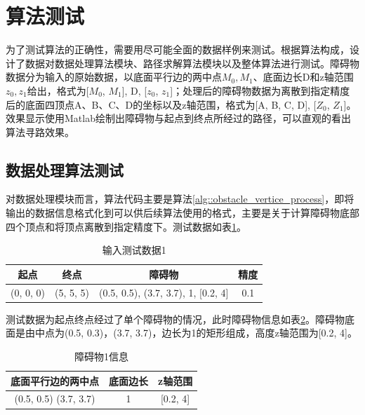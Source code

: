 \setcounter{table}{0}
\setcounter{figure}{0}
\section{算法测试}
\par 为了测试算法的正确性，需要用尽可能全面的数据样例来测试。根据算法构成，设计了数据对数据处理算法模块、路径求解算法模块以及整体算法进行测试。障碍物数据分为输入的原始数据，以底面平行边的两中点$M_0,M_1$、底面边长D和z轴范围$z_0,z_1$给出，格式为[$M_0$, $M_1$], D, [$z_0$, $z_1$]；处理后的障碍物数据为离散到指定精度后的底面四顶点A、B、C、D的坐标以及z轴范围，格式为[A, B, C, D], [$Z_0$, $Z_1$]。效果显示使用Matlab绘制出障碍物与起点到终点所经过的路径，可以直观的看出算法寻路效果。

\FloatBarrier
\subsection{数据处理算法测试}
\par 对数据处理模块而言，算法代码主要是算法\ref{alg::obstacle_vertice_process}，即将输出的数据信息格式化到可以供后续算法使用的格式，主要是关于计算障碍物底部四个顶点和将顶点离散到指定精度下。测试数据如表\ref{tab:process_input_test_data1}。
\begin{table}[!htb]
    \centering
    \caption{输入测试数据1}
    \label{tab:process_input_test_data1}
    \begin{tabular}{cccc}
        \toprule
        \bf{起点}&\bf{终点}&\bf{障碍物}&\bf{精度}\\
        \midrule
        (0, 0, 0)&(5, 5, 5)&(0.5, 0.5), (3.7, 3.7), 1, [0.2, 4]&0.1\\
        \bottomrule
    \end{tabular}
\end{table}
测试数据为起点终点经过了单个障碍物的情况，此时障碍物信息如表\ref{tab:process_input_test_data1_obstacle1}。障碍物底面是由中点为(0.5, 0.3)，(3.7, 3.7)，边长为1的矩形组成，高度z轴范围为[0.2, 4]。
\begin{table}[!htb]
    \centering
    \caption{障碍物1信息}
    \label{tab:process_input_test_data1_obstacle1}
    \begin{tabular}{ccc}
        \toprule
        \bf{底面平行边的两中点}&\bf{底面边长}&\bf{z轴范围}\\
        \midrule
        (0.5, 0.5) (3.7, 3.7)&1&[0.2, 4]\\
        \bottomrule
    \end{tabular}
\end{table}

